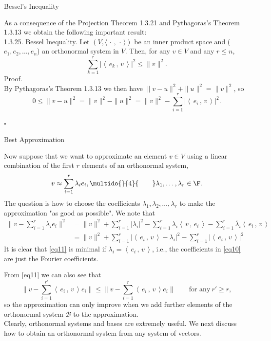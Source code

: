 \documentclass[smaller,hyperref={CJKbookmarks=true}]{beamer}
\newcommand{\myseries}[2]{$#1_1,#1_2,\dots,#1_#2$}
\newcommand{\scp}[2]{\left\langle\,#1\,,\,#2\,\right\rangle} \newcommand{\scpp}{\langle\,\cdot\,,\,\cdot\,\rangle}
\begin{document}
\begin{frame}[c,shrink]{Bessel's Inequality}
\begin{spacing}{1}
As a consequence of the Projection Theorem 1.3.21 and Pythagoras's Theorem 1.3.13 we obtain the following important result:\\
\alert{1.3.25. Bessel Inequality.} Let $(V,\scpp)$ be an inner product space and (\myseries{e}{n}) an orthonormal system in $V$. Then, for any $v\in V$ and any $r\leq n$,
\begin{equation}\label{eq9}
  \sum_{k=1}^{r}|\scp{e_k}{v}|^2\leq\|v\|^2.
\end{equation}
\alert{Proof.}\\
By Pythagoras's Theorem 1.3.13 we then have $\|v-u\|^2+\|u\|^2=\|v\|^2$, so
\begin{equation*}
  0\leq\|v-u\|^2=\|v\|^2-\|u\|^2=\|v\|^2-\sum_{i=1}^{r}|\scp{e_i}{v}|^2.
\end{equation*}
\begin{flushright}
  $\square$
\end{flushright}
\end{spacing}
\end{frame}
\begin{frame}{Best Approximation}
\begin{spacing}{0.9}
Now suppose that we want to approximate an element $v\in V$ using a linear combination of the first $r$ elements of an orthonormal system,
\begin{equation}\label{eq10}
  v\approx\sum_{i=1}^{r}\lambda_ie_i,\multido{}{4}{\qquad}\lambda_1,\ldots,\lambda_r\in\F.
\end{equation}
The question is how to choose the coef{}ficients \myseries{\lambda}{r} to make the approximation "as good as possible". We note that
\begin{equation}\label{eq11}
  \begin{split}
     \|v-\sum_{i=1}^{r}\lambda_ie_i\|^2 &=\|v\|^2+\sum_{i=1}^{r}|\lambda_i|^2-\sum_{i=1}^{r}\lambda_i\scp{v}{e_i}-\sum_{i=1}^{r}\overline{\lambda}_i\scp{e_i}{v} \\
       &=\|v\|^2+\sum_{i=1}^{r}\left|\scp{e_i}{v}-\lambda_i\right|^2-\sum_{i=1}^{r}|\scp{e_i}{v}|^2
  \end{split}
\end{equation}
It is clear that \eqref{eq11} is minimal if $\lambda_i=\scp{e_i}{v}$, i.e., the coef{}ficients in \eqref{eq10} are just the Fourier coef{}ficients.
\end{spacing}
\newpage
\begin{spacing}{1.1}
From \eqref{eq11} we can also see that
\begin{equation}\label{eq12}
  \Big\|v-\sum_{i=1}^{r'}\scp{e_i}{v}e_i\Big\|\leq\Big\|v-\sum_{i=1}^{r}\scp{e_i}{v}e_i\Big\|\qquad\text{for any}~r'\geq r,
\end{equation}
so the approximation can only improve when we add further elements of
the orthonormal system $\mathcal{B}$ to the approximation.\\
Clearly, orthonormal systems and bases are extremely useful. We next discuss how to obtain an orthonormal system from any system of vectors.
\end{spacing}
\end{frame}
\end{document}
